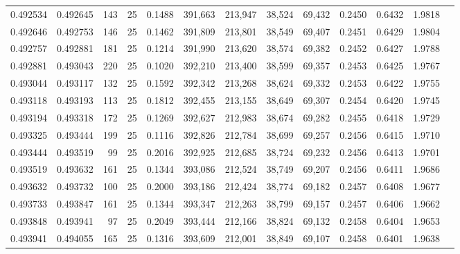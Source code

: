 \begin{tabular}{rrrrrrrrrrrrr}
0.492534 & 0.492645 &   143 &  25 &                                     0.1488 & 391,663 & 213,947 &  38,524 &  69,432 & 0.2450 & 0.6432 & 1.9818 \\
0.492646 & 0.492753 &   146 &  25 &                                     0.1462 & 391,809 & 213,801 &  38,549 &  69,407 & 0.2451 & 0.6429 & 1.9804 \\
0.492757 & 0.492881 &   181 &  25 &                                     0.1214 & 391,990 & 213,620 &  38,574 &  69,382 & 0.2452 & 0.6427 & 1.9788 \\
0.492881 & 0.493043 &   220 &  25 &                                     0.1020 & 392,210 & 213,400 &  38,599 &  69,357 & 0.2453 & 0.6425 & 1.9767 \\
0.493044 & 0.493117 &   132 &  25 &                                     0.1592 & 392,342 & 213,268 &  38,624 &  69,332 & 0.2453 & 0.6422 & 1.9755 \\
0.493118 & 0.493193 &   113 &  25 &                                     0.1812 & 392,455 & 213,155 &  38,649 &  69,307 & 0.2454 & 0.6420 & 1.9745 \\
0.493194 & 0.493318 &   172 &  25 &                                     0.1269 & 392,627 & 212,983 &  38,674 &  69,282 & 0.2455 & 0.6418 & 1.9729 \\
0.493325 & 0.493444 &   199 &  25 &                                     0.1116 & 392,826 & 212,784 &  38,699 &  69,257 & 0.2456 & 0.6415 & 1.9710 \\
0.493444 & 0.493519 &    99 &  25 &                                     0.2016 & 392,925 & 212,685 &  38,724 &  69,232 & 0.2456 & 0.6413 & 1.9701 \\
0.493519 & 0.493632 &   161 &  25 &                                     0.1344 & 393,086 & 212,524 &  38,749 &  69,207 & 0.2456 & 0.6411 & 1.9686 \\
0.493632 & 0.493732 &   100 &  25 &                                     0.2000 & 393,186 & 212,424 &  38,774 &  69,182 & 0.2457 & 0.6408 & 1.9677 \\
0.493733 & 0.493847 &   161 &  25 &                                     0.1344 & 393,347 & 212,263 &  38,799 &  69,157 & 0.2457 & 0.6406 & 1.9662 \\
0.493848 & 0.493941 &    97 &  25 &                                     0.2049 & 393,444 & 212,166 &  38,824 &  69,132 & 0.2458 & 0.6404 & 1.9653 \\
0.493941 & 0.494055 &   165 &  25 &                                     0.1316 & 393,609 & 212,001 &  38,849 &  69,107 & 0.2458 & 0.6401 & 1.9638 \\

\end{tabular}
